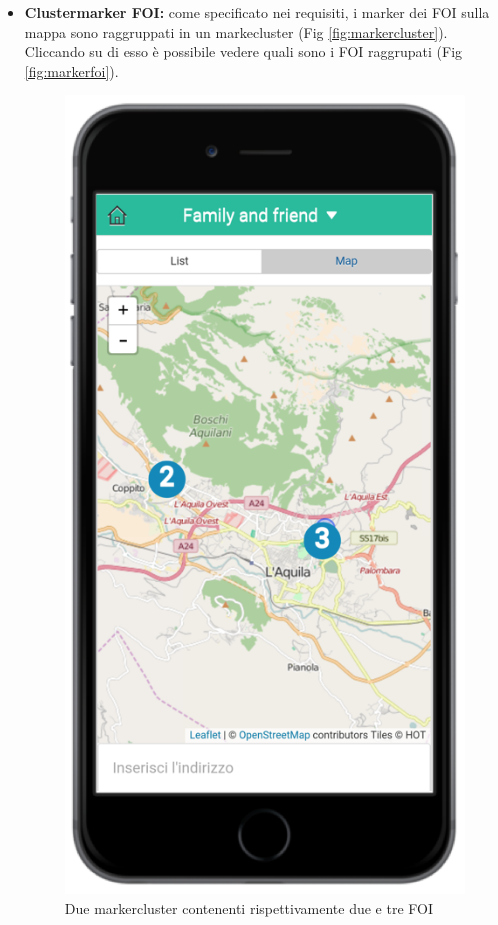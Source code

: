 \begin{itemize}
\item \textbf{Clustermarker FOI:} come specificato nei requisiti, i marker dei FOI sulla mappa sono raggruppati in un markecluster (Fig \ref{fig:markercluster}). Cliccando su di esso è possibile vedere quali sono i FOI raggrupati (Fig \ref{fig:markerfoi}). 
\begin{figure}[H]
	\centering
	\includegraphics[scale=1]{interfaccia/markercluster.png}
	\caption{Due markercluster contenenti rispettivamente due e tre FOI }

\end{figure}
\end{itemize}
